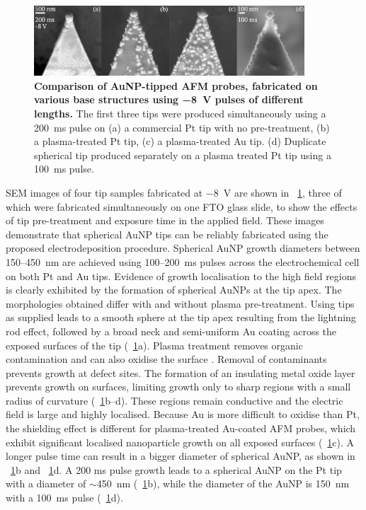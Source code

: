 \documentclass{article}
\begin{document}
\begin{figure}[bt]
\centering
\includegraphics[width=0.9\textwidth]{figures/figure_2}
\caption[Comparison of AuNP-tipped AFM probes, fabricated on various base structures using \SI{-8}{V} pulses of different lengths]{\textbf{Comparison of AuNP-tipped AFM probes, fabricated on various base structures using \SI{-8}{V} pulses of different lengths.} The first three tips were produced simultaneously using a \SI{200}{ms} pulse on (a) a commercial Pt tip with no pre-treatment, (b) a plasma-treated Pt tip, (c) a plasma-treated Au tip. (d) Duplicate spherical tip produced separately on a plasma treated Pt tip using a \SI{100}{ms} pulse.}
\label{fig:electrochemical_tips}
\end{figure}

SEM images of four tip samples fabricated at \SI{-8}{V} are shown in \figurename~\ref{fig:electrochemical_tips}, three of which were fabricated simultaneously on one FTO glass slide, to show the effects of tip pre-treatment and exposure time in the applied field. These images demonstrate that spherical AuNP tips can be reliably fabricated using the proposed electrodeposition procedure. Spherical AuNP growth diameters between 150--\SI{450}{nm} are achieved using 100--\SI{200}{ms} pulses across the electrochemical cell on both Pt and Au tips. Evidence of growth localisation to the high field regions is clearly exhibited by the formation of spherical AuNPs at the tip apex. The morphologies obtained differ with and without plasma pre-treatment. Using tips as supplied leads to a smooth sphere at the tip apex resulting from the lightning rod effect, followed by a broad neck and semi-uniform Au coating across the exposed surfaces of the tip (\figurename~\ref{fig:electrochemical_tips}a). Plasma treatment removes organic contamination and can also oxidise the surface \cite{li2003, fuchs2009}. Removal of contaminants prevents growth at defect sites. The formation of an insulating metal oxide layer prevents growth on surfaces, limiting growth only to sharp regions with a small radius of curvature (\figurename~\ref{fig:electrochemical_tips}b--d). These regions remain conductive and the electric field is large and highly localised. Because Au is more difficult to oxidise than Pt, the shielding effect is different for plasma-treated Au-coated AFM probes, which exhibit significant localised nanoparticle growth on all exposed surfaces (\figurename~\ref{fig:electrochemical_tips}c). A longer pulse time can result in a bigger diameter of spherical AuNP, as shown in \figurename~\ref{fig:electrochemical_tips}b and \figurename~\ref{fig:electrochemical_tips}d. A 200 ms pulse growth leads to a spherical AuNP on the Pt tip with a diameter of $\sim$\SI{450}{nm} (\figurename~\ref{fig:electrochemical_tips}b), while the diameter of the AuNP is \SI{150}{nm} with a \SI{100}{ms} pulse (\figurename~\ref{fig:electrochemical_tips}d).
\end{document}
